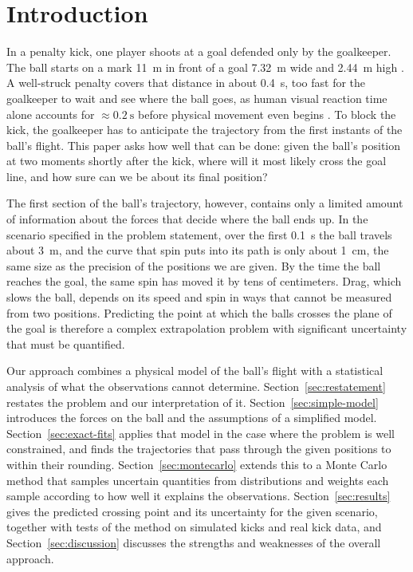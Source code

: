 \documentclass[10pt,a4paper]{article}
\begin{document}
\clearpage

\tableofcontents
\clearpage

\section{Introduction}

In a penalty kick, one player shoots at a goal defended only by the
goalkeeper. The ball starts on a mark \SI{11}{\metre} in front of a goal
\SI{7.32}{\metre} wide and \SI{2.44}{\metre} high \citep{ifab2025}.
A well-struck penalty covers that distance in about \SI{0.4}{\second}, too
fast for the goalkeeper to wait and see where the ball goes, as human visual
reaction time alone accounts for $\approx\SI{0.2}{\second}$ before physical
movement even begins \citep{teichner1954}. To block the
kick, the goalkeeper has to anticipate the trajectory from the first
instants of the ball's flight. This paper asks how well that can be done:
given the ball's position at two moments shortly after the kick, where will
it most likely cross the goal line, and how sure can we be about its final position?

The first section of the ball's trajectory, however, contains only a limited amount of information about the forces that
decide where the ball ends up. In the scenario specified in the problem statement, over the first \SI{0.1}{\second} the ball
travels about \SI{3}{\metre}, and the curve that spin puts into its path
is only about \SI{1}{\centi\metre}, the same size as the precision of the
positions we are given. By the time the ball reaches the goal, the same spin
has moved it by tens of centimeters. Drag, which slows the ball, depends on
its speed and spin in ways that cannot be measured from two positions.
Predicting the point at which the balls crosses the plane of the goal is therefore
a complex extrapolation problem with significant uncertainty that must be quantified.

Our approach combines a physical model of the ball's flight with a
statistical analysis of what the observations cannot determine.
Section~\ref{sec:restatement} restates the problem and our interpretation
of it. Section~\ref{sec:simple-model} introduces the forces on the ball and
the assumptions of a simplified model. Section~\ref{sec:exact-fits} applies
that model in the case where the problem is well constrained, and finds the
trajectories that pass through the given positions to within their rounding.
Section~\ref{sec:montecarlo} extends this to a Monte Carlo method that samples uncertain quantities from distributions and weights each sample according to how well it explains the observations.
Section~\ref{sec:results} gives the predicted crossing point and its
uncertainty for the given scenario, together with tests of the method on
simulated kicks and real kick data, and Section~\ref{sec:discussion} discusses the strengths
and weaknesses of the overall approach.
\end{document}
